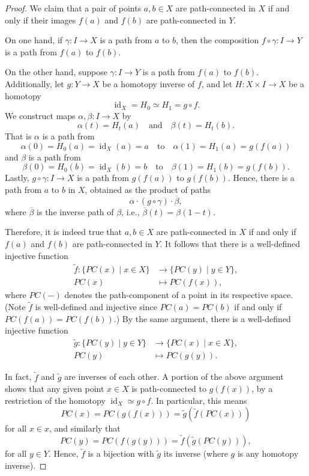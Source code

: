 \documentclass[12pt]{article}
\theoremstyle{definition}
\newcommand{\isp}[1]{\quad\text{#1}\quad}
\newcommand{\<}{\langle}
\renewcommand{\>}{\rangle}
\DeclareMathOperator{\id}{id}
\newcommand{\htpy}{\simeq}
\begin{document}
\begin{proof}
    We claim that a pair of points $a, b \in X$ are path-connected in $X$ if and only if their images $f(a)$ and $f(b)$ are path-connected in $Y$.

    On one hand, if $\gamma : I \to X$ is a path from $a$ to $b$, then the composition $f \circ \gamma : I \to Y$ is a path from $f(a)$ to $f(b)$.

    On the other hand, suppose $\gamma : I \to Y$ is a path from $f(a)$ to $f(b)$.
    Additionally, let $g : Y \to X$ be a homotopy inverse of $f$, and let $H : X \times I \to X$ be a homotopy
    \[
        \id_X = H_0 \htpy H_1 = g \circ f.
    \]
    We construct maps $\alpha, \beta : I \to X$ by
    \[
        \alpha(t) = H_t(a) \isp{and} \beta(t) = H_t(b).
    \]
    That is $\alpha$ is a path from
    \[
        \alpha(0) = H_0(a) = \id_X(a) = a \isp{to} \alpha(1) = H_1(a) = g(f(a))
    \]
    and $\beta$ is a path from
    \[
        \beta(0) = H_0(b) = \id_X(b) = b \isp{to} \beta(1) = H_1(b) = g(f(b)).
    \]
    Lastly, $g \circ \gamma : I \to X$ is a path from $g(f(a))$ to $g(f(b))$.
    Hence, there is a path from $a$ to $b$ in $X$, obtained as the product of paths
    \[
        \alpha \cdot (g \circ \gamma) \cdot \overline{\beta},
    \]
    where $\overline{\beta}$ is the inverse path of $\beta$, i.e., $\overline{\beta}(t) = \beta(1 - t)$.

    Therefore, it is indeed true that $a, b \in X$ are path-connected in $X$ if and only if $f(a)$ and $f(b)$ are path-connected in $Y$.
    It follows that there is a well-defined injective function
    \begin{align*}
        \tilde{f} : \{PC(x) \mid x \in X\} &\longrightarrow \{PC(y) \mid y \in Y\}, \\
            PC(x) &\longmapsto PC(f(x)),
    \end{align*}
    where $PC(-)$ denotes the path-component of a point in its respective space.
    (Note $\tilde{f}$ is well-defined and injective since $PC(a) = PC(b)$ if and only if $PC(f(a)) = PC(f(b))$.)
    By the same argument, there is a well-defined injective function
    \begin{align*}
        \tilde{g} : \{PC(y) \mid y \in Y\} &\longrightarrow \{PC(x) \mid x \in X\}, \\
            PC(y) &\longmapsto PC(g(y)).
    \end{align*}
    
    In fact, $\tilde{f}$ and $\tilde{g}$ are inverses of each other.
    A portion of the above argument shows that any given point $x \in X$ is path-connected to $g(f(x))$, by a restriction of the homotopy $\id_X \htpy g \circ f$.
    In particular, this means
    \[
        PC(x) = PC(g(f(x))) = \tilde{g}(\tilde{f}(PC(x)))
    \]
    for all $x \in x$, and similarly that
    \[
        PC(y) = PC(f(g(y))) = \tilde{f}(\tilde{g}(PC(y))),
    \]
    for all $y \in Y$.
    Hence, $\tilde{f}$ is a bijection with $\tilde{g}$ its inverse (where $g$ is any homotopy inverse).
\end{proof}
\end{document}

